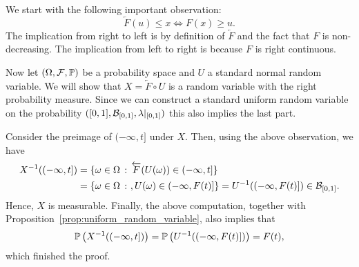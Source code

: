 \begin{problem}\label{prb:construction_random_variable_inverse}
We start with the following important observation: 
\[
	\overleftarrow{F}(u) \le x \iff F(x) \ge u.
\]
The implication from right to left is by definition of $\overleftarrow{F}$ and the fact that $F$ is non-decreasing. The implication from left to right is because $F$ is right continuous.


Now let $(\Omega,\mathcal F, \mathbb P)$ be a probability space and $U$ a standard normal random variable. We will show that $X = \overleftarrow{F} \circ U$ is a random variable with the right probability measure. Since we can construct a standard uniform random variable on the probability $([0,1], \mathcal B_{[0,1]}, \lambda|_{[0,1]})$ this also implies the last part. 

Consider the preimage of $(-\infty, t]$ under $X$. Then, using the above observation, we have
\begin{align*}
	X^{-1}((-\infty,t]) &= \{\omega \in \Omega \, : \, \overleftarrow{F}(U(\omega)) \in (-\infty,t]\}\\
	&= \{\omega \in \Omega \, :\ , U(\omega) \in (-\infty, F(t)]\} = U^{-1}((-\infty, F(t)]) \in \mathcal B_{[0,1]}.
\end{align*}
Hence, $X$ is measurable. Finally, the above computation, together with Proposition~\ref{prop:uniform_random_variable}, also implies that
\[
	\mathbb P\left(X^{-1}((-\infty,t])\right) = \mathbb P\left(U^{-1}((-\infty, F(t)])\right) = F(t),
\]
which finished the proof.
\end{problem}

